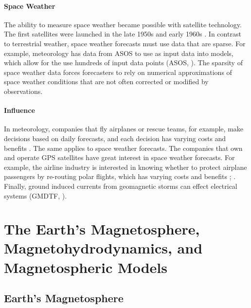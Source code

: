 \subsubsection{Space Weather}
The ability to measure space weather became possible with satellite technology.
The first satellites were launched in the late 1950s
and early 1960s \citep{Kallenrode}. In contrast to terrestrial weather, space
weather forecasts must use data that are sparse. For example, meteorology has data from ASOS to use as input data into models, which allow for the use
hundreds of input data points (ASOS, \citeyear{ASOSNum}). The sparsity of space
weather data forces forecasters to rely on numerical approximations of space
weather conditions that are not often corrected or modified by observations.
\subsubsection{Influence}
In meteorology, companies that fly airplanes or rescue teams, for example,
make decisions based on daily forecasts, and each decision has varying costs and
benefits \citep{Ahrens}. The same applies to space weather
forecasts. The companies that own and operate GPS satellites have
great interest in space weather forecasts.  For example, the airline
industry is interested in knowing whether to protect airplane
passengers by re-routing polar flights, which has varying costs and benefits
\citep{Lanzerotti2001}; \citep{Jones2005}. Finally, ground induced currents from
geomagnetic storms can effect electrical systems (GMDTF, \citeyear{GMDTF}).

\chapter{The Earth's Magnetosphere, Magnetohydrodynamics, and Magnetospheric
Models}
\section{Earth's Magnetosphere}
\label{MagnetosphereIntro}
